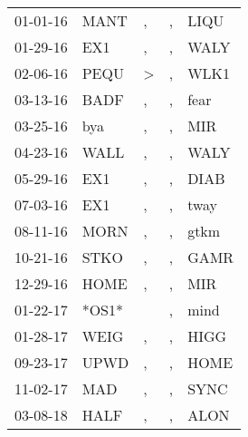 \begin{supertabular}{lllll}
 01-01-16 &   MANT &             , &  , &  LIQU \\
 01-29-16 &    EX1 &             , &  , &  WALY \\
 02-06-16 &   PEQU &  \textgreater &  , &  WLK1 \\
 03-13-16 &   BADF &             , &  , &  fear \\
 03-25-16 &    bya &             , &  , &   MIR \\
 04-23-16 &   WALL &             , &  , &  WALY \\
 05-29-16 &    EX1 &             , &  , &  DIAB \\
 07-03-16 &    EX1 &             , &  , &  tway \\
 08-11-16 &   MORN &             , &  , &  gtkm \\
 10-21-16 &   STKO &             , &  , &  GAMR \\
 12-29-16 &   HOME &             , &  , &   MIR \\
 01-22-17 &  *OS1* &               &  , &  mind \\
 01-28-17 &   WEIG &             , &  , &  HIGG \\
 09-23-17 &   UPWD &             , &  , &  HOME \\
 11-02-17 &    MAD &             , &  , &  SYNC \\
 03-08-18 &   HALF &             , &  , &  ALON \\
\end{supertabular}
